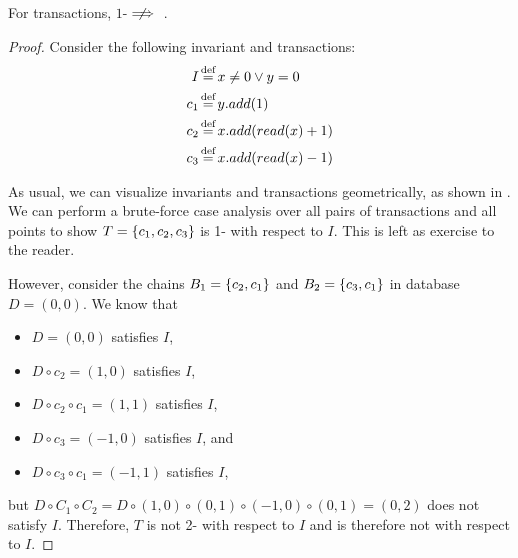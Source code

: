 \begin{claim}\label{clm:wimp-1-iconfluence}
  For \wimp{} transactions, $1$-\iconfluence $\centernot \implies$ \iconfluence.
\end{claim}
\begin{proof}
  Consider the following invariant and \wimp{} transactions:
  \begin{align*}
    I   &\defeq x \neq 0 \lor y = 0 \\
    c_1 &\defeq y.add(1) \\
    c_2 &\defeq x.add(read(x) + 1) \\
    c_3 &\defeq x.add(read(x) - 1)
  \end{align*}

  As usual, we can visualize invariants and transactions geometrically, as
  shown in . We can perform a brute-force case analysis over
  all pairs of transactions and all points to show $T = \left\{c_1, c_2, c_3\right\}$ is
  1-\iconfluent{} with respect to $I$. This is left as exercise to the reader.

  However, consider the \wimp{} chains $B_1 = \left\{c_2, c_1\right\}$ and $B_2 =
  \left\{c_3, c_1\right\}$ in database $D = (0, 0)$. We know that
  \begin{itemize}
    \item $D = (0, 0)$ satisfies $I$,
    \item $D \circ c_2 = (1, 0)$ satisfies $I$,
    \item $D \circ c_2 \circ c_1 = (1, 1)$ satisfies $I$,
    \item $D \circ c_3 = (-1, 0)$ satisfies $I$, and
    \item $D \circ c_3 \circ c_1 = (-1, 1)$ satisfies $I$,
  \end{itemize}
  but $D \circ C_1 \circ C_2 = D \circ (1, 0) \circ (0, 1) \circ (-1, 0) \circ
  (0, 1) = (0, 2)$ does not satisfy $I$. Therefore, $T$ is not 2-\iconfluent
  with respect to $I$ and is therefore not \iconfluent with respect to $I$.
\end{proof}


\newcommand{\width}{2}
\newcommand{\smallwidth}{1}
\newcommand{\height}{2}

\newcommand{\gridxy}{
  \draw[ultra thick] (-\width, 0) -- (\width, 0);
  \draw[ultra thick] (0, -\height) -- (0, \height);
  \draw (-\width, -\height) grid (\width, \height);
}

